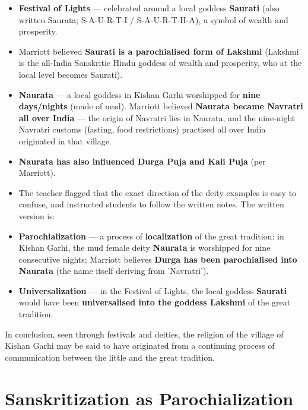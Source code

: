 \begin{ExampleBox}
\begin{itemize}
\item \textbf{Festival of Lights} --- celebrated around a local goddess \textbf{Saurati} (also written Saurata; S-A-U-R-T-I / S-A-U-R-T-H-A), a symbol of wealth and prosperity.
\item Marriott believed \textbf{Saurati is a parochialised form of Lakshmi} (Lakshmi is the all-India Sanskritic Hindu goddess of wealth and prosperity, who at the local level becomes Saurati).
\item \textbf{Naurata} --- a local goddess in Kishan Garhi worshipped for \textbf{nine days/nights} (made of mud). Marriott believed \textbf{Naurata became Navratri all over India} --- the origin of Navratri lies in Naurata, and the nine-night Navratri customs (fasting, food restrictions) practised all over India originated in that village.
\item \textbf{Naurata has also influenced Durga Puja and Kali Puja} (per Marriott).
\end{itemize}
\end{ExampleBox}

\begin{CriticalPoint}
\begin{itemize}
\item The teacher flagged that the exact direction of the deity examples is easy to confuse, and instructed students to follow the written notes. The written version is:
\item \textbf{Parochialization} --- a process of \textbf{localization} of the great tradition: in Kishan Garhi, the mud female deity \textbf{Naurata} is worshipped for nine consecutive nights; Marriott believes \textbf{Durga has been parochialised into Naurata} (the name itself deriving from 'Navratri').
\item \textbf{Universalization} --- in the Festival of Lights, the local goddess \textbf{Saurati} would have been \textbf{universalised into the goddess Lakshmi} of the great tradition.
\end{itemize}
\end{CriticalPoint}

In conclusion, seen through festivals and deities, the religion of the village of Kishan Garhi may be said to have originated from a continuing process of communication between the little and the great tradition.

\section{Sanskritization as Parochialization}

